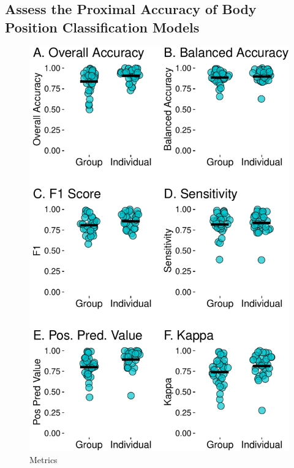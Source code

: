 \documentclass[
  man]{apa6}
\begin{document}
\hypertarget{assess-the-proximal-accuracy-of-body-position-classification-models}{%
\subsection{Assess the Proximal Accuracy of Body Position Classification Models}\label{assess-the-proximal-accuracy-of-body-position-classification-models}}

\begin{figure}

{\centering \includegraphics{manuscript_files/figure-latex/metrics-1} 

}

\caption{Metrics}\label{fig:metrics}
\end{figure}
\end{document}

